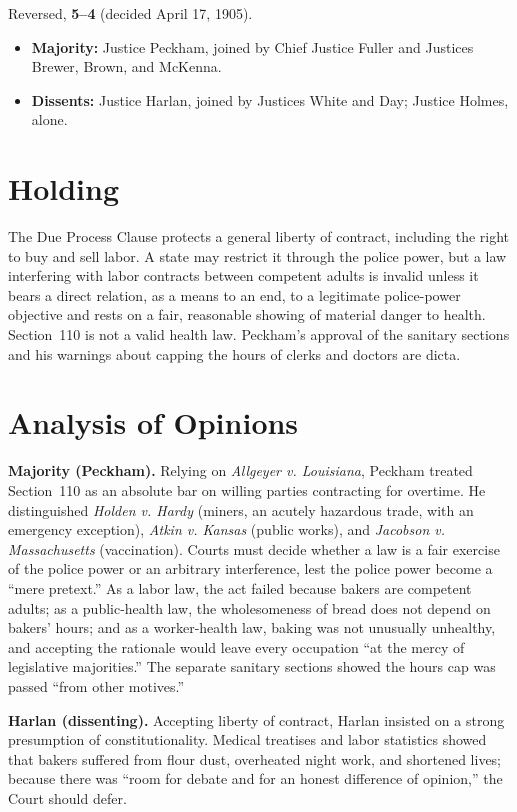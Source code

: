 \documentclass[12pt]{article}
\begin{document}
Reversed, \textbf{5--4} (decided April 17, 1905).
\begin{itemize}
\item \textbf{Majority:} Justice Peckham, joined by Chief Justice Fuller and Justices Brewer, Brown, and McKenna.
\item \textbf{Dissents:} Justice Harlan, joined by Justices White and Day; Justice Holmes, alone.
\end{itemize}

\section{Holding}

The Due Process Clause protects a general liberty of contract, including the right to buy and sell labor. A state may restrict it through the police power, but a law interfering with labor contracts between competent adults is invalid unless it bears a direct relation, as a means to an end, to a legitimate police-power objective and rests on a fair, reasonable showing of material danger to health. Section~110 is not a valid health law. Peckham's approval of the sanitary sections and his warnings about capping the hours of clerks and doctors are dicta.

\section{Analysis of Opinions}

\textbf{Majority (Peckham).} Relying on \textit{Allgeyer v. Louisiana}, Peckham treated Section~110 as an absolute bar on willing parties contracting for overtime. He distinguished \textit{Holden v. Hardy} (miners, an acutely hazardous trade, with an emergency exception), \textit{Atkin v. Kansas} (public works), and \textit{Jacobson v. Massachusetts} (vaccination). Courts must decide whether a law is a fair exercise of the police power or an arbitrary interference, lest the police power become a ``mere pretext.'' As a labor law, the act failed because bakers are competent adults; as a public-health law, the wholesomeness of bread does not depend on bakers' hours; and as a worker-health law, baking was not unusually unhealthy, and accepting the rationale would leave every occupation ``at the mercy of legislative majorities.'' The separate sanitary sections showed the hours cap was passed ``from other motives.''

\textbf{Harlan (dissenting).} Accepting liberty of contract, Harlan insisted on a strong presumption of constitutionality. Medical treatises and labor statistics showed that bakers suffered from flour dust, overheated night work, and shortened lives; because there was ``room for debate and for an honest difference of opinion,'' the Court should defer.
\end{document}
